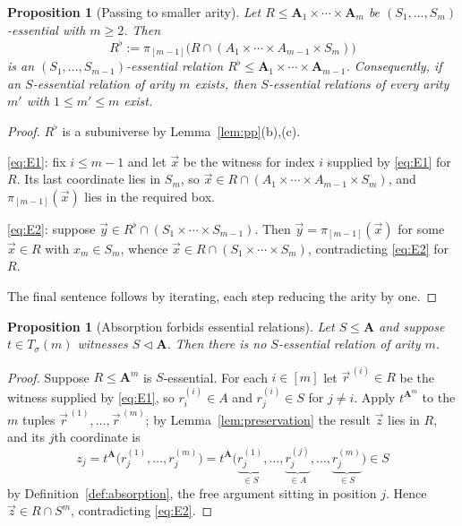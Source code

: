 \documentclass[11pt]{article}
\theoremstyle{mainplain}
\newtheorem{proposition}[theorem]{Proposition}
\theoremstyle{mainroman}
\theoremstyle{definition}
\numberwithin{equation}{section}
\newcommand{\bA}{\mathbf A}
\newcommand{\ab}{\lhd}
\newcommand{\Tm}{T_\sigma}
\begin{document}
\begin{proposition}[Passing to smaller arity]\label{prop:essential-down}
Let $R\le\bA_1\times\cdots\times\bA_m$ be $(S_1,\dots,S_m)$-essential with
$m\ge2$. Then
\[
 R^{\flat}:=\pi_{[m-1]}\bigl(R\cap(A_1\times\cdots\times A_{m-1}\times S_m)\bigr)
\]
is an $(S_1,\dots,S_{m-1})$-essential relation
$R^{\flat}\le\bA_1\times\cdots\times\bA_{m-1}$. Consequently, if an
$S$-essential relation of arity $m$ exists, then $S$-essential relations of
every arity $m'$ with $1\le m'\le m$ exist.
\end{proposition}
\begin{proof}
$R^{\flat}$ is a subuniverse by Lemma~\ref{lem:pp}(b),(c).

\eqref{eq:E1}: fix $i\le m-1$ and let $\vec x$ be the witness for index $i$
supplied by \eqref{eq:E1} for $R$. Its last coordinate lies in $S_m$, so
$\vec x\in R\cap(A_1\times\cdots\times A_{m-1}\times S_m)$, and
$\pi_{[m-1]}(\vec x)$ lies in the required box.

\eqref{eq:E2}: suppose $\vec y\in R^{\flat}\cap(S_1\times\cdots\times S_{m-1})$.
Then $\vec y=\pi_{[m-1]}(\vec x)$ for some $\vec x\in R$ with $x_m\in S_m$,
whence $\vec x\in R\cap(S_1\times\cdots\times S_m)$, contradicting
\eqref{eq:E2} for $R$.

The final sentence follows by iterating, each step reducing the arity by one.
\end{proof}

\begin{proposition}[Absorption forbids essential relations]\label{prop:absorption-blocks}
Let $S\le\bA$ and suppose $t\in\Tm(m)$ witnesses $S\ab\bA$. Then there is no
$S$-essential relation of arity $m$.
\end{proposition}
\begin{proof}
Suppose $R\le\bA^m$ is $S$-essential. For each $i\in[m]$ let $\vec r^{\,(i)}\in R$
be the witness supplied by \eqref{eq:E1}, so $r^{(i)}_i\in A$ and
$r^{(i)}_j\in S$ for $j\ne i$. Apply $t^{\bA^m}$ to the $m$ tuples
$\vec r^{\,(1)},\dots,\vec r^{\,(m)}$; by Lemma~\ref{lem:preservation} the result
$\vec z$ lies in $R$, and its $j$th coordinate is
\[
  z_j=t^{\bA}\bigl(r^{(1)}_j,\dots,r^{(m)}_j\bigr)
     =t^{\bA}\bigl(\underbrace{r^{(1)}_j}_{\in S},\dots,
        \underbrace{r^{(j)}_j}_{\in A},\dots,\underbrace{r^{(m)}_j}_{\in S}\bigr)\in S
\]
by Definition~\ref{def:absorption}, the free argument sitting in position $j$.
Hence $\vec z\in R\cap S^m$, contradicting \eqref{eq:E2}.
\end{proof}
\end{document}
